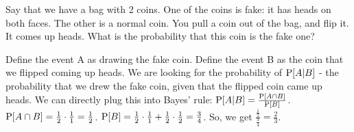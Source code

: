 \question Say that we have a bag with 2 coins. One of the coins is fake: it has heads on both faces. The other is a normal coin. You pull a coin out of the bag, and flip it. It comes up heads. What is the probability that this coin is the fake one? 

\begin{solution}[1 cm]
Define the event A as drawing the fake coin. Define the event B as the coin that we flipped coming up heads. We are looking for the probability of $\P[A|B]$ - the probability that we drew the fake coin, given that the flipped coin came up heads. We can directly plug this into Bayes' rule: $\P[A|B] = \frac{\P[A \cap B]}{\P[B]}$.  $\P[A \cap B] = \frac{1}{2} \cdot \frac{1}{1} = \frac{1}{2}$. $\P[B] = \frac{1}{2} \cdot \frac{1}{1} + \frac{1}{2} \cdot \frac{1}{2} = \frac{3}{4} $. So, we get $\frac{\frac{1}{2}}{\frac{3}{4}} = \frac{2}{3}$.
\end{solution}